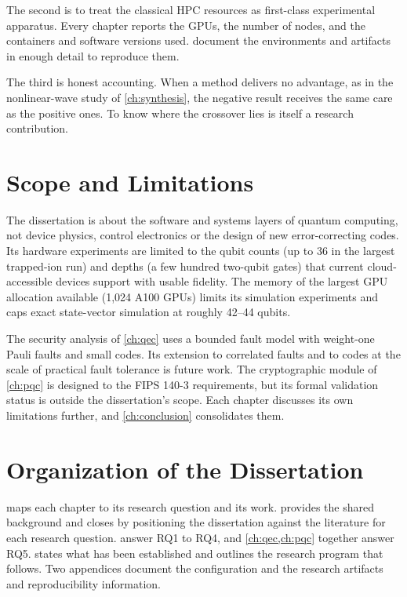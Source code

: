 The second is to treat the classical HPC resources as first-class experimental apparatus. Every chapter reports the GPUs, the number of nodes, and the containers and software versions used.  document the environments and artifacts in enough detail to reproduce them.

The third is honest accounting. When a method delivers no advantage, as in the nonlinear-wave study of \cref{ch:synthesis}, the negative result receives the same care as the positive ones. To know where the crossover lies is itself a research contribution.

\section{Scope and Limitations}\label{sec:intro:scope}

The dissertation is about the software and systems layers of quantum computing, not device physics, control electronics or the design of new error-correcting codes. Its hardware experiments are limited to the qubit counts (up to 36 in the largest trapped-ion run) and depths (a few hundred two-qubit gates) that current cloud-accessible devices support with usable fidelity. The memory of the largest GPU allocation available (1,024 A100 GPUs) limits its simulation experiments and caps exact state-vector simulation at roughly 42--44 qubits.

The security analysis of \cref{ch:qec} uses a bounded fault model with weight-one Pauli faults and small codes. Its extension to correlated faults and to codes at the scale of practical fault tolerance is future work. The cryptographic module of \cref{ch:pqc} is designed to the FIPS 140-3 requirements, but its formal validation status is outside the dissertation's scope. Each chapter discusses its own limitations further, and \cref{ch:conclusion} consolidates them.

\section{Organization of the Dissertation}\label{sec:intro:organization}

 maps each chapter to its research question and its work.  provides the shared background and closes by positioning the dissertation against the literature for each research question.  answer RQ1 to RQ4, and \cref{ch:qec,ch:pqc} together answer RQ5.  states what has been established and outlines the research program that follows. Two appendices document the \qgear{} configuration and the research artifacts and reproducibility information.

